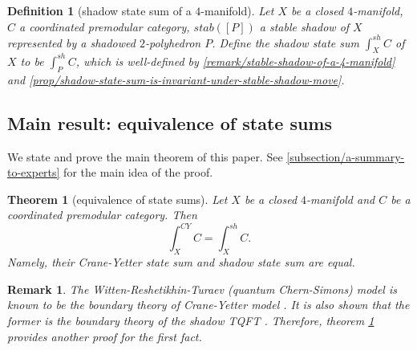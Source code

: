 \documentclass[12pt]{extarticle}
\numberwithin{equation}{section} %
\theoremstyle{mystyle}
\newtheorem{theorem}[equation]{Theorem}
\newtheorem{definition}[equation]{Definition}
\newtheorem{remark}[equation]{Remark}
\begin{document}

\begin{definition}[shadow state sum of a $4$-manifold]\label{def/shadow-state-sum-of-a-4-manifold}
  Let $X$ be a closed $4$-manifold, $C$ a coordinated premodular
  category, $stab([P])$ a stable shadow of $X$ represented by a
  shadowed $2$-polyhedron $P$. Define the shadow state sum
  $\int_{X}^{sh} C$ of $X$ to be $\int_{P}^{sh} C$, which is
  well-defined by \ref{remark/stable-shadow-of-a-4-manifold} and
  \ref{prop/shadow-state-sum-is-invariant-under-stable-shadow-move}.
\end{definition}

\subsection{Main result: equivalence of state sums}

\noindent We state and prove the main theorem of this paper. See
\ref{subsection/a-summary-to-experts} for the main idea of the
proof.

\begin{theorem}[equivalence of state sums]\label{theorem/main-theorem}
  Let $X$ be a closed $4$-manifold and $C$ be a coordinated
  premodular category. Then
  $$\int^{CY}_{X}C = \int^{sh}_{X} C.$$
  Namely, their Crane-Yetter state sum and shadow state sum are
  equal.
\end{theorem}

\begin{remark}
  The Witten-Reshetikhin-Turaev (quantum Chern-Simons) model is
  known to be the boundary theory of Crane-Yetter model
  \cite{barrett/observables-in-tv-and-cy} \cite{tham/phd-thesis}.
  It is also shown that the former is the boundary theory of the
  shadow TQFT \cite[X.3.2 \& theorem
  X.3.3]{turaev-qiok-3-manifolds}. Therefore, theorem
  \ref{theorem/main-theorem} provides another proof for the first
  fact.
\end{remark}
\end{document}
